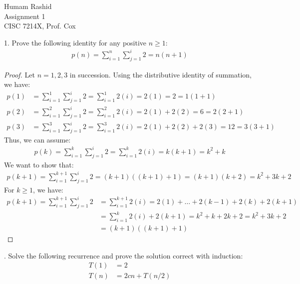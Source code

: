 \documentclass{scrartcl}
\begin{document}
\begin{flushleft}

    Humam Rashid\\
    Assignment 1\\
    CISC 7214X, Prof. Cox\\
    \bigskip
    
    1. Prove the following identity for any positive $n \geq 1$:
    \begin{align*}
        p(n) = \sum_{i=1}^{n}\sum_{j=1}^{i} 2 = n (n + 1)
    \end{align*}
    \begin{proof}
        Let $n = 1,2,3$ in succession. Using the distributive identity of summation, we have:
        \begin{align*}
            p(1) &= \sum_{i=1}^{1}\sum_{j=1}^{i} 2 = \sum_{i=1}^{1} 2(i) = 2(1) = 2 = 1(1 + 1)\\
            p(2) &= \sum_{i=1}^{2}\sum_{j=1}^{i} 2 = \sum_{i=1}^{2} 2(i) = 2(1) + 2(2) = 6
            = 2(2 + 1)\\
            p(3) &= \sum_{i=1}^{3}\sum_{j=1}^{i} 2 = \sum_{i=1}^{3} 2(i) = 2(1) + 2(2) + 2(3) = 12
            = 3(3 + 1)
            \tag{1}
        \end{align*}
        Thus, we can assume:
        \begin{align*}
            p(k) = \sum_{i=1}^{k}\sum_{j=1}^{i} 2 = \sum_{i=1}^{k} 2(i) = k(k + 1) = k^2 + k
            \tag{2}
        \end{align*}
        We want to show that:
        \begin{align*}
            p(k + 1) = \sum_{i=1}^{k + 1}\sum_{j=1}^{i} 2 = (k + 1) ((k + 1) + 1) = (k + 1) (k + 2) = k^2 + 3k + 2
        \end{align*}
        For $k \geq 1$, we have:
        \begin{align*}
            p(k + 1) = \sum_{i=1}^{k + 1}\sum_{j=1}^{i} 2 &= \sum_{i=1}^{k+1} 2(i) = 2(1) + \ldots
            + 2(k - 1) + 2(k) + 2(k + 1) \\
            &= \sum_{i=1}^{k} 2(i) + 2(k + 1) = k^2 + k + 2k + 2 = k^2 + 3k + 2 \\
            &= (k + 1) ((k + 1) + 1)
            \tag{3}
        \end{align*}
    \end{proof}
    . Solve the following recurrence and prove the solution correct with induction:
    \begin{align*}
        T(1) &= 2\\
        T(n) &= 2cn + T(n/2)
    \end{align*}

\end{flushleft}
\end{document}
